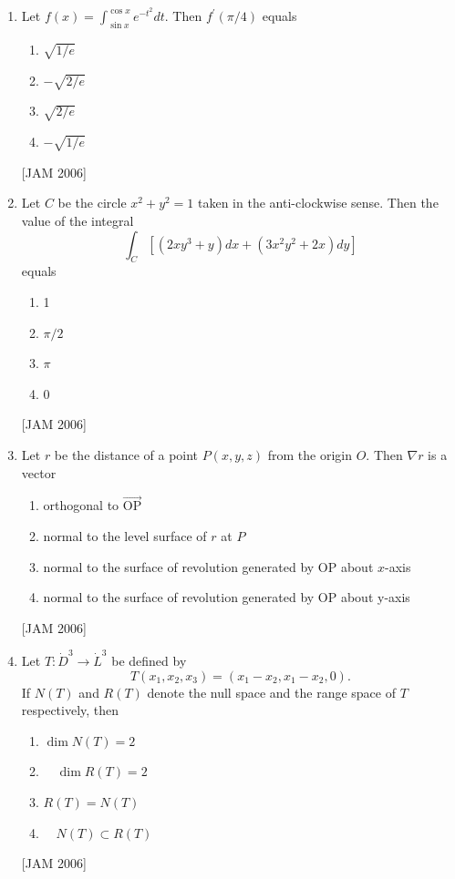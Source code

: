 \begin{enumerate}
\item  Let $f(x)=\int_{\sin x}^{\cos x} e^{-t^{2}} d t$. Then $f^{\prime}(\pi / 4)$ equals
\begin{enumerate} 
    \item $\sqrt{1 / e}$
    \item $-\sqrt{2 / e}$
    \item $\sqrt{2 / e}$
    \item $-\sqrt{1 / e}$
\end{enumerate}
 \hfill [JAM 2006]

 

\item Let $C$ be the circle $x^{2}+y^{2}=1$ taken in the anti-clockwise sense. Then the value of the integral
$$
\int_{C}\left[\left(2 x y^{3}+y\right) d x+\left(3 x^{2} y^{2}+2 x\right) d y\right]
$$
equals
\begin{enumerate}
\item 1
\item $\pi / 2$
\item  $\pi$
\item  0
\end{enumerate}
 \hfill [JAM 2006]

  \item Let $r$ be the distance of a point $P(x, y, z)$ from the origin $O$. Then $\nabla r$ is a vector
  \begin{enumerate}
    \item orthogonal to $\overrightarrow{\mathrm{OP}}$
    \item normal to the level surface of $r$ at $P$
    \item normal to the surface of revolution generated by OP about $x$-axis
    \item normal to the surface of revolution generated by OP about y-axis
\end{enumerate}
 \hfill [JAM 2006]


\item Let $T: \dot{D}^{3} \rightarrow \dot{L}^{3}$ be defined by
$$
T\left(x_{1}, x_{2}, x_{3}\right)=\left(x_{1}-x_{2}, x_{1}-x_{2}, 0\right) .
$$
If $N(T)$ and $R(T)$ denote the null space and the range space of $T$ respectively, then
\begin{enumerate}
    \item $\operatorname{dim} N(T)=2$
    \item $\quad \operatorname{dim} R(T)=2$
    \item $R(T)=N(T)$
    \item $\quad N(T) \subset R(T)$
\end{enumerate}
 \hfill [JAM 2006]





\end{enumerate}
